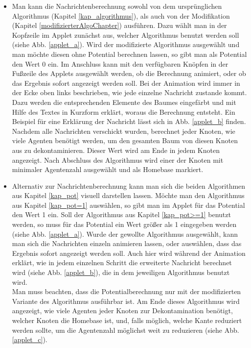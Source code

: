 \begin{itemize}
	\item Man kann die Nachrichtenberechnung sowohl von dem ursprünglichen Algorithmus (Kapitel \ref{kap_algorithmus}), als auch von der Modifikation (Kapitel \ref{modifizierterAlgoChapter}) ausführen. Dazu wählt man in der Kopfzeile im Applet zunächst aus, welcher Algorithmus benutzt werden soll (siehe Abb. \ref{applet_a}). Wird der modifizierte Algorithmus ausgewählt und man möchte diesen ohne Potential berechnen lassen, so gibt man als Potential den Wert 0 ein. Im Anschluss kann mit den verfügbaren Knöpfen in der Fußzeile des Applets ausgewählt werden, ob die Berechnung animiert, oder ob das Ergebnis sofort angezeigt werden soll. Bei der Animation wird immer in der Ecke oben links beschrieben, wie jede einzelne Nachricht zustande kommt. Dazu werden die entsprechenden Elemente des Baumes eingefärbt und mit Hilfe des Textes in Kurzform erklärt, woraus die Berechnung entsteht. Ein Beispiel für eine Erklärung der Nachricht lässt sich in Abb. \ref{applet_b} finden. Nachdem alle Nachrichten verschickt wurden, berechnet jeder Knoten, wie viele Agenten benötigt werden, um den gesamten Baum von diesen Knoten aus zu dekontaminieren. Dieser Wert wird am Ende in jedem Knoten angezeigt. Nach Abschluss des Algorithmus wird einer der Knoten mit minimaler Agentenzahl ausgewählt und als Homebase markiert.
	
	\item Alternativ zur Nachrichtenberechnung kann man sich die beiden Algorithmen aus Kapitel \ref{kap_pot} visuell darstellen lassen. Möchte man den Algorithmus aus Kapitel \ref{kap_pot=1} auswählen, so gibt man im Applet für das Potential den Wert 1 ein. Soll der Algorithmus aus Kapitel \ref{kap_pot>=1} benutzt werden, so muss für das Potential ein Wert größer als 1 eingegeben werden (siehe Abb. \ref{applet_a}). Wurde der gewollte Algorithmus ausgewählt, kann man sich die Nachrichten einzeln animieren lassen, oder auswählen, dass das Ergebnis sofort angezeigt werden soll. Auch hier wird während der Animation erklärt, wie in jedem einzelnen Schritt die erweiterte Nachricht berechnet wird (siehe Abb. \ref{applet_b}), die in dem jeweiligen Algorithmus benutzt wird. \\
	Man muss beachten, dass die Potentialberechnung nur mit der modifizierten Variante des Algorithmus ausführbar ist. Am Ende dieses Algorithmus wird angezeigt, wie viele Agenten jeder Knoten zur Dekontamination benötigt, welcher Knoten die Homebase ist, und, falls möglich, welche Kante reduziert werden sollte, um die Agentenzahl möglichst weit zu reduzieren (siehe Abb. \ref{applet_c}).
	

\end{itemize}
